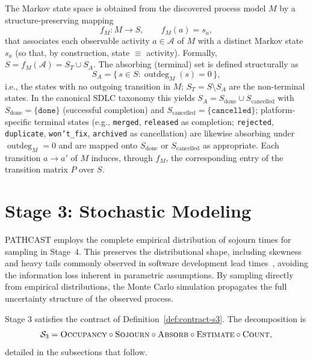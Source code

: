 \begin{definition}
\label{def:state-space}
The Markov state space is obtained from the discovered process model $M$ by
a structure-preserving mapping
\[
    f_M : M \to S, \qquad f_M(a) = s_a,
\]
that associates each observable activity $a \in \mathcal{A}$ of $M$ with a
distinct Markov state $s_a$ (so that, by construction, state $\equiv$
activity). Formally, $S = f_M(\mathcal{A}) = S_T \cup S_A$. The absorbing
(terminal) set is defined structurally as
\[
    S_A = \{\, s \in S : \operatorname{outdeg}_M(s) = 0 \,\},
\]
i.e., the states with no outgoing transition in $M$; $S_T = S \setminus S_A$
are the non-terminal states. In the canonical SDLC taxonomy this yields
$S_A = S_{\text{done}} \cup S_{\text{cancelled}}$ with
$S_{\text{done}} = \{\texttt{done}\}$ (successful completion) and
$S_{\text{cancelled}} = \{\texttt{cancelled}\}$; platform-specific terminal
states (e.g., \texttt{merged}, \texttt{released} as completion;
\texttt{rejected}, \texttt{duplicate}, \texttt{won't\_fix}, \texttt{archived}
as cancellation) are likewise absorbing under $\operatorname{outdeg}_M = 0$
and are mapped onto $S_{\text{done}}$ or $S_{\text{cancelled}}$ as
appropriate. Each transition $a \to a'$ of $M$ induces, through $f_M$, the
corresponding entry of the transition matrix $P$ over $S$.
\end{definition}


\section{Stage 3: Stochastic Modeling}
\label{sec:stage3}

\begin{remark}
\label{rem:empirical-distributions}
PATHCAST employs the complete empirical distribution of sojourn times for
sampling in Stage~4. This preserves the distributional shape, including
skewness and heavy tails commonly observed in software development lead
times~\cite{little2011factory, flyvbjerg2022empirical}, avoiding the
information loss inherent in parametric assumptions. By sampling directly
from empirical distributions, the Monte Carlo simulation propagates the
full uncertainty structure of the observed process.
\end{remark}

Stage 3 satisfies the contract of Definition~\ref{def:contract-s3}. The
decomposition is
\begin{equation}
\label{eq:s3-decomposition}
\mathcal{S}_3 = \textsc{Occupancy} \circ \textsc{Sojourn} \circ
    \textsc{Absorb} \circ \textsc{Estimate} \circ \textsc{Count},
\end{equation}
detailed in the subsections that follow.


